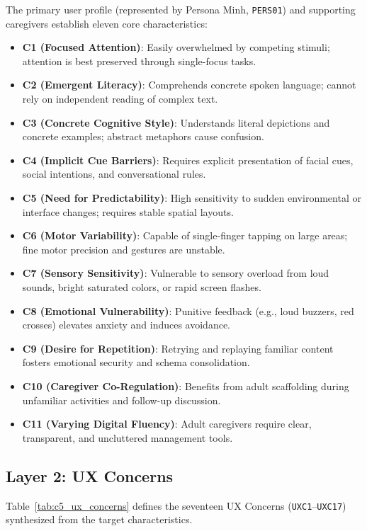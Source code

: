 The primary user profile (represented by Persona Minh, \texttt{PERS01}) and supporting caregivers establish eleven core characteristics:
\begin{itemize}
    \item \textbf{C1 (Focused Attention)}: Easily overwhelmed by competing stimuli; attention is best preserved through single-focus tasks.
    \item \textbf{C2 (Emergent Literacy)}: Comprehends concrete spoken language; cannot rely on independent reading of complex text.
    \item \textbf{C3 (Concrete Cognitive Style)}: Understands literal depictions and concrete examples; abstract metaphors cause confusion.
    \item \textbf{C4 (Implicit Cue Barriers)}: Requires explicit presentation of facial cues, social intentions, and conversational rules.
    \item \textbf{C5 (Need for Predictability)}: High sensitivity to sudden environmental or interface changes; requires stable spatial layouts.
    \item \textbf{C6 (Motor Variability)}: Capable of single-finger tapping on large areas; fine motor precision and gestures are unstable.
    \item \textbf{C7 (Sensory Sensitivity)}: Vulnerable to sensory overload from loud sounds, bright saturated colors, or rapid screen flashes.
    \item \textbf{C8 (Emotional Vulnerability)}: Punitive feedback (e.g., loud buzzers, red crosses) elevates anxiety and induces avoidance.
    \item \textbf{C9 (Desire for Repetition)}: Retrying and replaying familiar content fosters emotional security and schema consolidation.
    \item \textbf{C10 (Caregiver Co-Regulation)}: Benefits from adult scaffolding during unfamiliar activities and follow-up discussion.
    \item \textbf{C11 (Varying Digital Fluency)}: Adult caregivers require clear, transparent, and uncluttered management tools.
\end{itemize}

\subsection{Layer 2: UX Concerns}

Table~\ref{tab:c5_ux_concerns} defines the seventeen UX Concerns (\texttt{UXC1}--\texttt{UXC17}) synthesized from the target characteristics.

